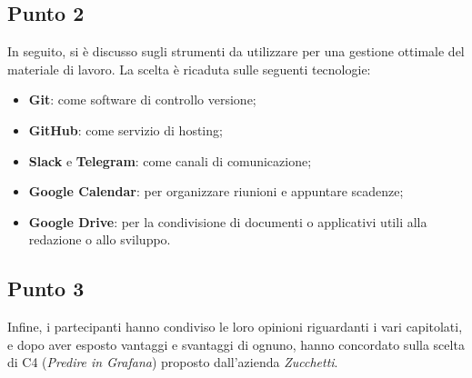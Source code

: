     \subsection{Punto 2}
        In seguito, si è discusso sugli strumenti da utilizzare per una gestione ottimale del materiale di lavoro. La scelta è ricaduta sulle seguenti tecnologie:
        \begin{itemize}
            \item \textbf{Git}: come software di controllo versione;
            \item \textbf{GitHub}: come servizio di hosting;
            \item \textbf{Slack} e \textbf{Telegram}: come canali di comunicazione;
            \item \textbf{Google Calendar}: per organizzare riunioni e appuntare scadenze;
            \item \textbf{Google Drive}: per la condivisione di documenti o applicativi utili alla redazione o allo sviluppo.
        \end{itemize}
    \subsection{Punto 3}
        Infine, i partecipanti hanno condiviso le loro opinioni riguardanti i vari capitolati\glo, e dopo aver esposto vantaggi e svantaggi di ognuno, hanno concordato sulla scelta di C4 (\textit{Predire in Grafana}\glo) proposto dall'azienda \textit{Zucchetti}.